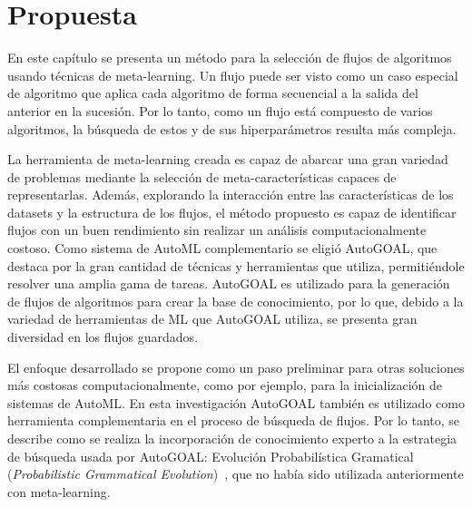 \chapter{Propuesta}\label{chapter:proposal}


%

En este capítulo se presenta un método para la selección de flujos de algoritmos usando técnicas de meta-learning. Un flujo puede ser visto como un caso especial de algoritmo que aplica cada algoritmo de forma secuencial a la salida del anterior en la sucesión. Por lo tanto, como un flujo está compuesto de varios algoritmos, la búsqueda de estos y de sus hiperparámetros resulta más compleja. 

La herramienta de meta-learning creada es capaz de abarcar una gran variedad de problemas mediante la selección de meta-características capaces de representarlas. Además, explorando la interacción entre las características de los datasets y la estructura de los flujos, el método propuesto es capaz de identificar flujos con un buen rendimiento sin realizar un análisis computacionalmente costoso. Como sistema de AutoML complementario se eligió AutoGOAL, que destaca por la gran cantidad de técnicas y herramientas que utiliza, permitiéndole resolver una amplia gama de tareas. AutoGOAL es utilizado para la generación de flujos de algoritmos para crear la base de conocimiento, por lo que, debido a la variedad de herramientas de ML que AutoGOAL utiliza, se presenta gran diversidad en los flujos guardados.


El enfoque desarrollado se propone como un paso preliminar para otras soluciones más costosas computacionalmente, como por ejemplo, para la inicialización de sistemas de AutoML. En esta investigación AutoGOAL también es utilizado como herramienta complementaria en el proceso de búsqueda de flujos. Por lo tanto, se describe como se realiza la incorporación de conocimiento experto a la estrategia de búsqueda usada por AutoGOAL: Evolución Probabilística Gramatical (\textit{Probabilistic Grammatical Evolution})~\cite{pge2015}, que no había sido utilizada anteriormente con meta-learning.


